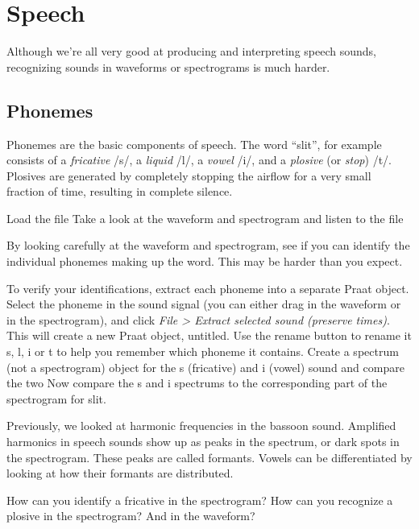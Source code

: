 \documentclass[a4paper, 9pt]{article}
\begin{document}
\section{Speech}\label{speech}

Although we're all very good at producing and interpreting speech sounds, recognizing sounds in waveforms or spectrograms is much harder.

\subsection{Phonemes}\label{phonemes}

Phonemes are the basic components of speech. The word ``slit'', for
example consists of a \emph{fricative} /s/, a \emph{liquid} /l/, a \emph{vowel} /i/, and a \emph{plosive} (or
\emph{stop}) /t/. Plosives are generated by completely stopping the airflow for a very small fraction of time, resulting in complete silence.

\begin{exercise}
\action Load the file 
\action Take a look at the waveform and spectrogram and listen to the file
\end{exercise}

By looking carefully at the waveform and spectrogram, see if you can
identify the individual phonemes making up the word. This may be harder
than you expect.

\begin{exercise}
\action To verify your identifications, extract each phoneme into a separate Praat object. Select the phoneme in the sound signal (you can either drag in the waveform or in the spectrogram), and click \emph{File > Extract selected sound (preserve times)}. This will create a new Praat object, untitled. Use the rename button to rename it s, l, i or t to help you remember which phoneme it contains. 
\action Create a spectrum (not a spectrogram) object for the s (fricative) and i (vowel) sound and compare the two
\action Now compare the s and i spectrums to the corresponding part of the spectrogram for slit. 
\end{exercise}

Previously, we looked at harmonic frequencies in the bassoon sound. Amplified harmonics in speech sounds show up as peaks in the spectrum, or dark spots in the spectrogram. These peaks are called formants. Vowels can be differentiated by looking at how their formants are distributed.

\begin{exercise}
\askstar How can you identify a fricative in the spectrogram?
\askstar How can you recognize a plosive in the spectrogram? And in the waveform?
\end{exercise}
\end{document}
